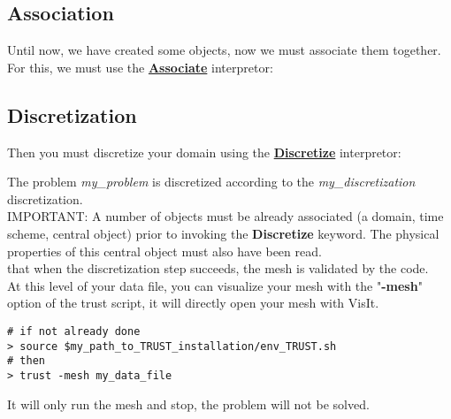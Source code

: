 \subsection{Association}
Until now, we have created some objects, now we must associate them together.
For this, we must use the \href{\REFERENCEMANUAL\#associate}{\textbf{Associate}} interpretor:
    \begin{center}
    \end{center}




\subsection{Discretization}
Then you must discretize your domain using the \href{\REFERENCEMANUAL\#discretize}{\textbf{Discretize}} interpretor:
    \begin{center}
    \end{center}

The problem \textit{my\_problem} is discretized according to the \textit{my\_discretization} discretization.\\

IMPORTANT: A number of objects must be already associated (a domain, time scheme, central object) prior to invoking the \textbf{Discretize} keyword. The physical properties of this central object must also have been read.\\

\Note that when the discretization step succeeds, the mesh is validated by the code.\\

At this level of your data file, you can visualize your mesh with the "\textbf{-mesh}" option of the trust script, it will directly open your mesh with VisIt.
\begin{verbatim}
# if not already done
> source $my_path_to_TRUST_installation/env_TRUST.sh
# then
> trust -mesh my_data_file
\end{verbatim}
It will only run the mesh and stop, the problem will not be solved.



